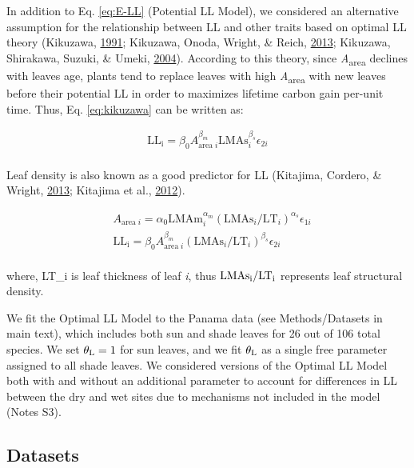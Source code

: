 \documentclass[12pt,]{article}
\theoremstyle{definition}
\theoremstyle{definition}
\theoremstyle{definition}
\theoremstyle{remark}
\begin{document}
In addition to Eq. \eqref{eq:E-LL} (Potential LL Model), we considered an
alternative assumption for the relationship between LL and other traits
based on optimal LL theory (Kikuzawa,
\protect\hyperlink{ref-Kikuzawa1991}{1991}; Kikuzawa, Onoda, Wright, \&
Reich, \protect\hyperlink{ref-Kikuzawa2013}{2013}; Kikuzawa, Shirakawa,
Suzuki, \& Umeki, \protect\hyperlink{ref-Kikuzawa2004}{2004}). According
to this theory, since \emph{A}\textsubscript{area} declines with leaves
age, plants tend to replace leaves with high
\emph{A}\textsubscript{area} with new leaves before their potential LL
in order to maximizes lifetime carbon gain per-unit time. Thus, Eq.
\eqref{eq:kikuzawa} can be written as:

\begin{align}
\mathrm{LL_i} = \beta_0 A_{\mathrm{area} \; i}^{\beta_m} \mathrm{LMAs}_{i}^{\beta_s} \epsilon_{2i}\\
\end{align}

Leaf density is also known as a good predictor for LL (Kitajima,
Cordero, \& Wright, \protect\hyperlink{ref-Kitajima2013}{2013}; Kitajima
et al., \protect\hyperlink{ref-Kitajima2012}{2012}).

\begin{align}
& A_{\mathrm{area} \; i}
= \alpha_0\mathrm{LMAm}_{i}^{\alpha_m} (\mathrm{LMAs}_{i}/ \mathrm{LT}_{i})^{\alpha_s}\epsilon_{1i}\\
& \mathrm{LL_i} = \beta_0 A_{\mathrm{area} \; i}^{\beta_m} ({\mathrm{LMAs}_{i}/\mathrm{LT}_{i}})^{\beta_s} \epsilon_{2i}\\
\end{align}

where, LT\_i is leaf thickness of leaf \emph{i}, thus
\(\rm{LMAs}_i/\rm{LT}_i\) represents leaf structural density.

We fit the Optimal LL Model to the Panama data (see Methods/Datasets in
main text), which includes both sun and shade leaves for 26 out of 106
total species. We set \(\theta_{\rm L} = 1\) for sun leaves, and we fit
\(\theta_{\rm L}\) as a single free parameter assigned to all shade
leaves. We considered versions of the Optimal LL Model both with and
without an additional parameter to account for differences in LL between
the dry and wet sites due to mechanisms not included in the model (Notes
S3).

\hypertarget{datasets}{%
\subsection{Datasets}\label{datasets}}
\end{document}
